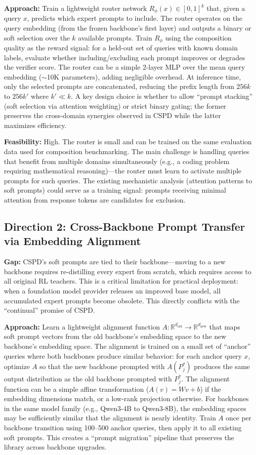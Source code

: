 \documentclass[11pt,a4paper]{article}
\begin{document}
\textbf{Approach:} Train a lightweight router network $R_\phi(x) \in [0,1]^k$ that, given a query $x$, predicts which expert prompts to include. The router operates on the query embedding (from the frozen backbone's first layer) and outputs a binary or soft selection over the $k$ available prompts. Train $R_\phi$ using the composition quality as the reward signal: for a held-out set of queries with known domain labels, evaluate whether including/excluding each prompt improves or degrades the verifier score. The router can be a simple 2-layer MLP over the mean query embedding ($\sim$10K parameters), adding negligible overhead. At inference time, only the selected prompts are concatenated, reducing the prefix length from $256k$ to $256k'$ where $k' \ll k$. A key design choice is whether to allow ``prompt stacking'' (soft selection via attention weighting) or strict binary gating; the former preserves the cross-domain synergies observed in CSPD while the latter maximizes efficiency.

\textbf{Feasibility:} High. The router is small and can be trained on the same evaluation data used for composition benchmarking. The main challenge is handling queries that benefit from multiple domains simultaneously (e.g., a coding problem requiring mathematical reasoning)---the router must learn to activate multiple prompts for such queries. The existing mechanistic analysis (attention patterns to soft prompts) could serve as a training signal: prompts receiving minimal attention from response tokens are candidates for exclusion.

\subsection{Direction 2: Cross-Backbone Prompt Transfer via Embedding Alignment}
\textbf{Gap:} CSPD's soft prompts are tied to their backbone---moving to a new backbone requires re-distilling every expert from scratch, which requires access to all original RL teachers. This is a critical limitation for practical deployment: when a foundation model provider releases an improved base model, all accumulated expert prompts become obsolete. This directly conflicts with the ``continual'' promise of CSPD.

\textbf{Approach:} Learn a lightweight alignment function $A: \mathbb{R}^{d_\text{old}} \rightarrow \mathbb{R}^{d_\text{new}}$ that maps soft prompt vectors from the old backbone's embedding space to the new backbone's embedding space. The alignment is trained on a small set of ``anchor'' queries where both backbones produce similar behavior: for each anchor query $x$, optimize $A$ so that the new backbone prompted with $A(P_j^*)$ produces the same output distribution as the old backbone prompted with $P_j^*$. The alignment function can be a simple affine transformation ($A(v) = Wv + b$) if the embedding dimensions match, or a low-rank projection otherwise. For backbones in the same model family (e.g., Qwen3-4B to Qwen3-8B), the embedding spaces may be sufficiently similar that the alignment is nearly identity. Train $A$ once per backbone transition using 100--500 anchor queries, then apply it to all existing soft prompts. This creates a ``prompt migration'' pipeline that preserves the library across backbone upgrades.
\end{document}
